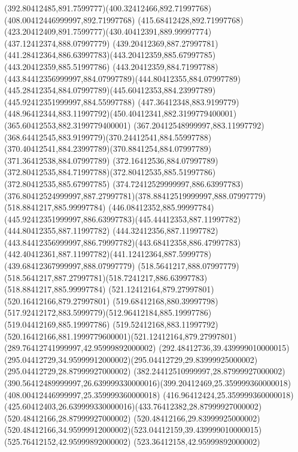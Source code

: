 {{	\curveto(392.80412485,891.7599777)(400.32412466,892.71997768)(408.00412446999997,892.71997768)
	\curveto(415.68412428,892.71997768)(423.20412409,891.7599777)(430.40412391,889.99997774)
	\closepath
	\moveto(437.12412374,888.07997779)
	\curveto(439.20412369,887.27997781)(441.28412364,886.63997783)(443.20412359,885.67997785)
	\lineto(443.20412359,885.51997786)
	\curveto(443.20412359,884.71997788)(443.84412356999997,884.07997789)(444.80412355,884.07997789)
	\curveto(445.28412354,884.07997789)(445.60412353,884.23997789)(445.92412351999997,884.55997788)
	\curveto(447.36412348,883.9199779)(448.96412344,883.11997792)(450.40412341,882.3199779400001)
	\lineto(365.60412553,882.3199779400001)
	\curveto(367.20412548999997,883.11997792)(368.64412545,883.9199779)(370.24412541,884.55997788)
	\curveto(370.40412541,884.23997789)(370.8841254,884.07997789)(371.36412538,884.07997789)
	\curveto(372.16412536,884.07997789)(372.80412535,884.71997788)(372.80412535,885.51997786)
	\lineto(372.80412535,885.67997785)
	\curveto(374.72412529999997,886.63997783)(376.80412524999997,887.27997781)(378.88412519999997,888.07997779)
	\closepath
	\moveto(518.8841217,885.99997784)
	\lineto(446.08412352,885.99997784)
	\curveto(445.92412351999997,886.63997783)(445.44412353,887.11997782)(444.80412355,887.11997782)
	\curveto(444.32412356,887.11997782)(443.84412356999997,886.79997782)(443.68412358,886.47997783)
	\curveto(442.40412361,887.11997782)(441.12412364,887.5999778)(439.68412367999997,888.07997779)
	\lineto(518.5641217,888.07997779)
	\curveto(518.5641217,887.27997781)(518.7241217,886.63997783)(518.8841217,885.99997784)
	\closepath
	\moveto(521.12412164,879.27997801)
	\lineto(520.16412166,879.27997801)
	\curveto(519.68412168,880.39997798)(517.92412172,883.5999779)(512.96412184,885.19997786)
	\lineto(519.04412169,885.19997786)
	\curveto(519.52412168,883.11997792)(520.16412166,881.1999779600001)(521.12412164,879.27997801)
	\closepath
	\moveto(289.76412741999997,42.95999892000002)
	\curveto(292.48412736,39.439999010000015)(295.04412729,34.95999912000002)(295.04412729,29.83999925000002)
	\lineto(295.04412729,28.87999927000002)
	\lineto(382.24412510999997,28.87999927000002)
	\curveto(390.56412489999997,26.639999330000016)(399.20412469,25.359999360000018)(408.00412446999997,25.359999360000018)
	\curveto(416.96412424,25.359999360000018)(425.60412403,26.639999330000016)(433.76412382,28.87999927000002)
	\lineto(520.48412166,28.87999927000002)
	\lineto(520.48412166,29.83999925000002)
	\curveto(520.48412166,34.95999912000002)(523.04412159,39.439999010000015)(525.76412152,42.95999892000002)
	\lineto(523.36412158,42.95999892000002)
}}
